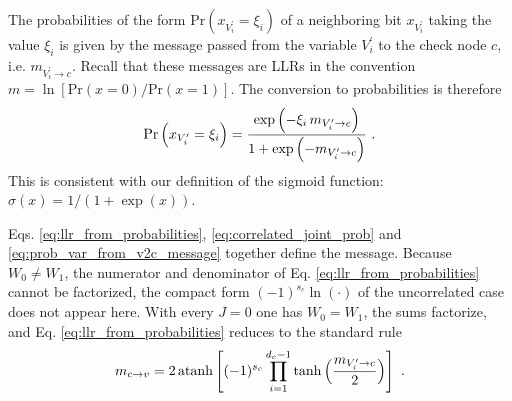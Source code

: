 \documentclass{article}
\def\ts{\thinspace}
\def\P{\text{Pr}}
\begin{document}
The probabilities of the form $\P\left(x_{V^{\prime}_{i}} = \xi_{i}\right)$ of a neighboring bit $x_{V^{\prime}_{i}}$ taking the value $\xi_{i}$ is given by the message passed from the variable $V^{\prime}_{i}$ to the check node $c$, i.e. $m_{V^{\prime}_{i} \to c}$. Recall that these messages are LLRs in the convention $m = \ln\left[\P(x=0)/\P(x=1)\right]$. The conversion to probabilities is therefore
\begin{gather}
    \P\left(x_{V^{\prime}_{i}} = \xi_{i}\right) = \dfrac{\exp\left(-\xi_{i} \ts m_{V^{\prime}_{i} \to c}\right)}{1 + \exp\left(-m_{V^{\prime}_{i} \to c}\right)} ~. \label{eq:prob_var_from_v2c_message}
\end{gather}
This is consistent with our definition of the sigmoid function: $\sigma(x) = 1/(1+\exp(x))$.

Eqs. \ref{eq:llr_from_probabilities}, \ref{eq:correlated_joint_prob} and \ref{eq:prob_var_from_v2c_message} together define the message. Because $W_0 \neq W_1$, the numerator and denominator of Eq. \ref{eq:llr_from_probabilities} cannot be factorized, the compact form $(-1)^{s_c}\ln(\cdot)$ of the uncorrelated case does not appear here. With every $J = 0$ one has $W_0 = W_1$, the sums factorize, and Eq. \ref{eq:llr_from_probabilities} reduces to the standard rule
\begin{gather}
    m_{c \to v} = 2\ts\mathrm{atanh}\left[(-1)^{s_c} \prod_{i=1}^{d_c-1} \tanh\left(\dfrac{m_{V^{\prime}_{i} \to c}}{2}\right)\right] ~.
\end{gather}
\end{document}
